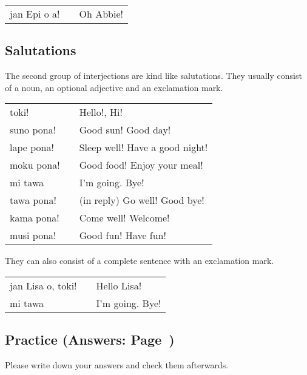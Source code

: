 \begin{supertabular}{p{5,5cm}|ll}
    jan Epi o a! &  & Oh Abbie! \\
\end{supertabular}

\subsection*{Salutations}
The second group of interjections are kind like salutations.
They usually consist of a noun, an optional adjective and an exclamation mark.

\begin{supertabular}{p{5,5cm}|ll}
    toki!      &  & Hello!, Hi!                    \\
    suno pona! &  & Good sun! Good day!            \\
    lape pona! &  & Sleep well! Have a good night! \\
    moku pona! &  & Good food! Enjoy your meal!    \\
    mi tawa    &  & I'm going. Bye!                \\
    tawa pona! &  & (in reply) Go well! Good bye!  \\
    kama pona! &  & Come well! Welcome!            \\
    musi pona! &  & Good fun! Have fun!            \\
\end{supertabular}

They can also consist of a complete sentence with an exclamation mark.

\begin{supertabular}{p{5,5cm}|ll}
    jan Lisa o, toki! &  & Hello Lisa!     \\
    mi tawa           &  & I'm going. Bye! \\
\end{supertabular}

\newpage

\subsection*{Practice (Answers: Page~\pageref{'commands_interjections'})}
Please write down your answers and check them afterwards.


